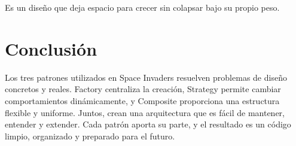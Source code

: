 \documentclass[12pt]{article}
\begin{document}
Es un diseño que deja espacio para crecer sin colapsar bajo su propio peso.

\newpage
\section{Conclusión}

Los tres patrones utilizados en Space Invaders resuelven problemas de diseño concretos y reales. Factory centraliza la creación, Strategy permite cambiar comportamientos dinámicamente, y Composite proporciona una estructura flexible y uniforme. Juntos, crean una arquitectura que es fácil de mantener, entender y extender. Cada patrón aporta su parte, y el resultado es un código limpio, organizado y preparado para el futuro.
\end{document}
